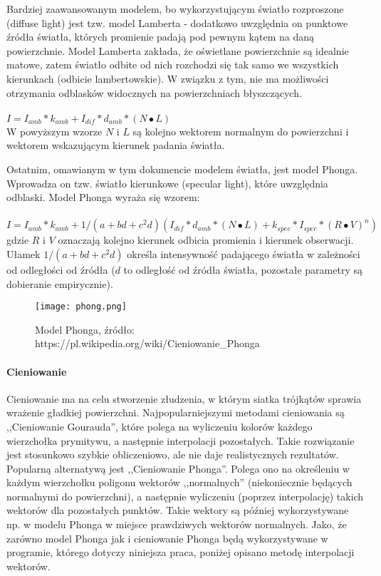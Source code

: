Bardziej zaawansowanym modelem, bo wykorzystującym światło rozproszone (diffuse light) jest tzw. model Lamberta - dodatkowo uwzględnia on punktowe źródła światła, których promienie padają pod pewnym kątem na daną powierzchnie. Model Lamberta zakłada, że oświetlane powierzchnie są idealnie matowe, zatem światło odbite od nich rozchodzi się tak samo we wszystkich kierunkach (odbicie lambertowskie). W związku z tym, nie ma możliwości otrzymania odblasków widocznych na powierzchniach błyszczących.\\
\\
$I = I_{amb} * k_{amb} + I_{dif} * d_{amb} * (N \bullet L)$
\\
W powyższym wzorze $N$ i $L$ są kolejno wektorem normalnym do powierzchni i wektorem wskazującym kierunek padania światła.


Ostatnim, omawianym w tym dokumencie modelem światła, jest model Phonga. Wprowadza on tzw. światło kierunkowe (specular light), które uwzględnia odblaski. Model Phonga wyraża się wzorem:\\
\\
$I = I_{amb} * k_{amb} + 1/(a + bd + c^2d)(I_{dif} * d_{amb} * (N \bullet L) + k_{spec} * I_{spec} * (R \bullet V)^n)$
\\
gdzie $R$ i $V$ oznaczają kolejno kierunek odbicia promienia i kierunek obserwacji. Ułamek $1/(a + bd + c^2d)$ określa intensywność padającego światła w zależności od odległości od źródła ($d$ to odległość od źródła światła, pozostałe parametry są dobieranie empirycznie).

\begin{figure}[h!]
\centering
  \caption{Model Phonga, źródło: https://pl.wikipedia.org/wiki/Cieniowanie\_Phonga}
  \texttt{[image: phong.png]}
\end{figure}

\paragraph{Cieniowanie}


Cieniowanie ma na celu stworzenie złudzenia, w którym siatka trójkątów sprawia wrażenie gładkiej powierzchni. Najpopularniejszymi metodami cieniowania są ,,Cieniowanie Gourauda'', które polega na wyliczeniu kolorów każdego wierzchołka prymitywu, a następnie interpolacji pozostałych. Takie rozwiązanie jest stosunkowo szybkie obliczeniowo, ale nie daje realistycznych rezultatów. Popularną alternatywą jest ,,Cieniowanie Phonga''. Polega ono na określeniu w każdym wierzchołku poligonu wektorów ,,normalnych'' (niekoniecznie będących normalnymi do powierzchni), a następnie wyliczeniu (poprzez interpolację) takich wektorów dla pozostałych punktów. Takie wektory są później wykorzystywane np. w modelu Phonga w miejsce prawdziwych wektorów normalnych. Jako, że zarówno model Phonga jak i cieniowanie Phonga będą wykorzystywane w programie, którego dotyczy niniejsza praca, poniżej opisano metodę interpolacji wektorów.


